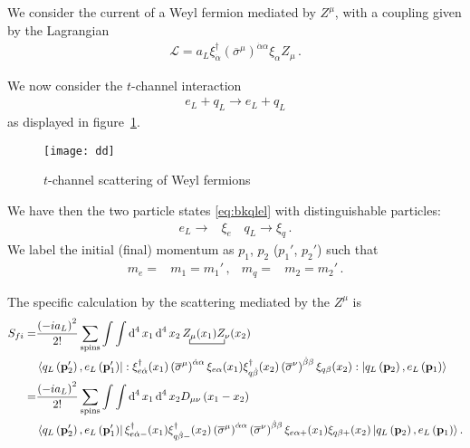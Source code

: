 We consider the current of a Weyl fermion mediated by $Z^{\mu}$, with a coupling given by the Lagrangian
\begin{align}
\label{eq:xietaz}
\mathcal{L}=a_L \xi^{\dagger}_{\dot{\alpha}}\left( \overline{\sigma}^{\mu} \right)^{\dot{\alpha}\alpha}\xi_{\alpha} Z_{\mu}\,.
\end{align}

We now consider the $t$-channel interaction
\begin{align}
  e_L+q_L \to e_L+q_L
\end{align}
as displayed in figure~\ref{fig:ddex}.
\begin{figure}
  \centering
  \texttt{[image: dd]}
  \caption{$t$-channel scattering of Weyl fermions}
  \label{fig:ddex}
\end{figure}

We have then the two particle states \eqref{eq:bkqlel}  with distinguishable particles:
\begin{align}
  e_L\to& \xi_e\,& q_L\to \xi_q\,.
\end{align}
We label the initial (final) momentum as $p_1$, $p_2$ ($p_1'$, $p_2'$) such that
\begin{align}
  m_e=&m_1=m_1'\,,&m_q=&m_2=m_2'\,.
\end{align}


The specific calculation by the scattering mediated by the $Z^{\mu}$ is 
\begin{align}
  S_{fi}=&\frac{\left( -ia_L \right)^{2}}{2!}\sum_{\text{spins}}\int\int \operatorname{d}^4x_1 \operatorname{d}^4x_2
\bcontraction{\,}{Z_{\mu}}{(x_1)}{Z_{\nu}}\,Z_{\mu}(x_1)Z_{\nu}(x_2) \nonumber\\
&\left\langle q_L \left(\mathbf{p}'_2\right),e_L\left(\mathbf{p}'_1\right) \right|
  : \xi^{\dagger}_{e\dot{\alpha}}(x_1)\left( \overline{\sigma}^{\mu} \right)^{\dot{\alpha}\alpha}\xi_{e\alpha}(x_1)\xi^{\dagger}_{q\dot{\beta}}(x_2)\left( \overline{\sigma}^{\nu} \right)^{\dot{\beta}\beta}\xi_{q\beta}(x_2):
 \left| q_L\left(\mathbf{p}_2\right) ,e_L \left(\mathbf{p}_1\right)  \right\rangle \nonumber\\
=&\frac{\left( -ia_L \right)^{2}}{2!}\sum_{\text{spins}}\int\int \operatorname{d}^4x_1 \operatorname{d}^4x_2
D_{\mu\nu} \left( x_1-x_2 \right)\nonumber\\
&\left\langle q_L \left(\mathbf{p}'_2\right),e_L\left(\mathbf{p}'_1\right)\right|
   \xi^{\dagger}_{e\dot{\alpha} -}(x_1)\xi^{\dagger}_{q\dot{\beta}-}(x_2)\left( \overline{\sigma}^{\mu} \right)^{\dot{\alpha}\alpha}\left( \overline{\sigma}^{\nu} \right)^{\dot{\beta}\beta}\xi_{e\alpha +}(x_1)\xi_{q\beta +}(x_2)
 \left| q_L\left(\mathbf{p}_2\right), e_L \left(\mathbf{p}_1\right)\right\rangle. 
\end{align}



